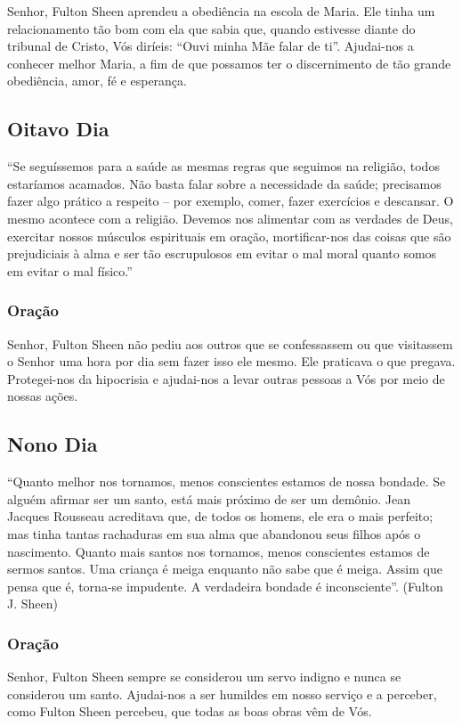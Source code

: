 \documentclass[11pt]{article}
\begin{document}
Senhor, Fulton Sheen aprendeu a obediência na escola de Maria. Ele tinha um relacionamento tão bom com ela que sabia que, quando estivesse diante do tribunal de Cristo, Vós diríeis: “Ouvi minha Mãe falar de ti”. Ajudai-nos a conhecer melhor Maria, a fim de que possamos ter o discernimento de tão grande obediência, amor, fé e esperança.

\textbf{}


\subsection{Oitavo Dia}

“Se seguíssemos para a saúde as mesmas regras que seguimos na religião, todos estaríamos acamados. Não basta falar sobre a necessidade da saúde; precisamos fazer algo prático a respeito – por exemplo, comer, fazer exercícios e descansar. O mesmo acontece com a religião. Devemos nos alimentar com as verdades de Deus, exercitar nossos músculos espirituais em oração, mortificar-nos das coisas que são prejudiciais à alma e ser tão escrupulosos em evitar o mal moral quanto somos em evitar o mal físico.”

\subsubsection{Oração}
Senhor, Fulton Sheen não pediu aos outros que se confessassem ou que visitassem o Senhor uma hora por dia sem fazer isso ele mesmo. Ele praticava o que pregava. Protegei-nos da hipocrisia e ajudai-nos a levar outras pessoas a Vós por meio de nossas ações.

\textbf{}

\subsection{Nono Dia}
“Quanto melhor nos tornamos, menos conscientes estamos de nossa bondade. Se alguém afirmar ser um santo, está mais próximo de ser um demônio. Jean Jacques Rousseau acreditava que, de todos os homens, ele era o mais perfeito; mas tinha tantas rachaduras em sua alma que abandonou seus filhos após o nascimento. Quanto mais santos nos tornamos, menos conscientes estamos de sermos santos. Uma criança é meiga enquanto não sabe que é meiga. Assim que pensa que é, torna-se impudente. A verdadeira bondade é inconsciente”. (Fulton J. Sheen)

\subsubsection{Oração}
Senhor, Fulton Sheen sempre se considerou um servo indigno e nunca se considerou um santo. Ajudai-nos a ser humildes em nosso serviço e a perceber, como Fulton Sheen percebeu, que todas as boas obras vêm de Vós.
\end{document}
